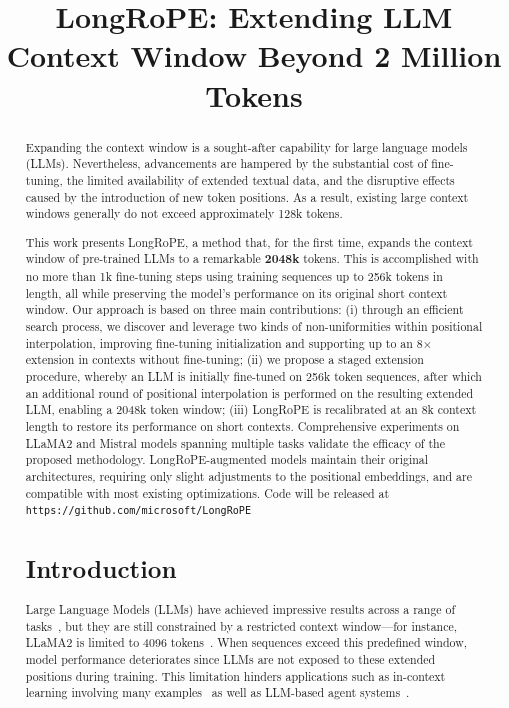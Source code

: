 \title{LongRoPE: Extending LLM Context Window Beyond 2 Million Tokens}

\begin{abstract}
Expanding the context window is a sought-after capability for large language models (LLMs). Nevertheless, advancements are hampered by the substantial cost of fine-tuning, the limited availability of extended textual data, and the disruptive effects caused by the introduction of new token positions. As a result, existing large context windows generally do not exceed approximately 128k tokens.

This work presents LongRoPE, a method that, for the first time, expands the context window of pre-trained LLMs to a remarkable \textbf{2048k} tokens. This is accomplished with no more than 1k fine-tuning steps using training sequences up to 256k tokens in length, all while preserving the model’s performance on its original short context window. Our approach is based on three main contributions: (i) through an efficient search process, we discover and leverage two kinds of non-uniformities within positional interpolation, improving fine-tuning initialization and supporting up to an 8$\times$ extension in contexts without fine-tuning; (ii) we propose a staged extension procedure, whereby an LLM is initially fine-tuned on 256k token sequences, after which an additional round of positional interpolation is performed on the resulting extended LLM, enabling a 2048k token window; (iii) LongRoPE is recalibrated at an 8k context length to restore its performance on short contexts. Comprehensive experiments on LLaMA2 and Mistral models spanning multiple tasks validate the efficacy of the proposed methodology. LongRoPE-augmented models maintain their original architectures, requiring only slight adjustments to the positional embeddings, and are compatible with most existing optimizations. Code will be released at \texttt{https://github.com/microsoft/LongRoPE}

\section{Introduction}

Large Language Models (LLMs) have achieved impressive results across a range of tasks~\cite{gpt4,llama2}, but they are still constrained by a restricted context window—for instance, LLaMA2 is limited to 4096 tokens~\cite{llama2}. When sequences exceed this predefined window, model performance deteriorates since LLMs are not exposed to these extended positions during training. This limitation hinders applications such as in-context learning involving many examples~\cite{Huang2023FewerIM} as well as LLM-based agent systems~\cite{park2023generative,madaan2023selfrefine}.


\end{abstract}
